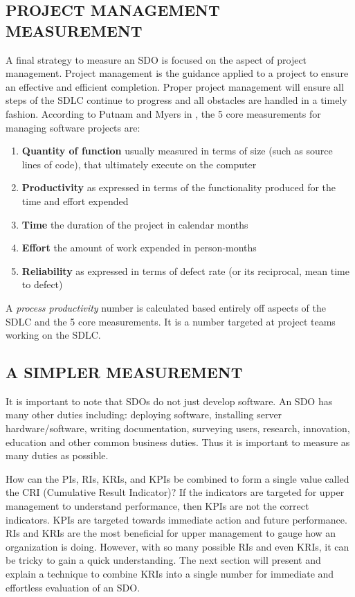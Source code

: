 \documentclass[SDSUThesis.tex]{subfiles}
\begin{document}
    \subsection{PROJECT MANAGEMENT MEASUREMENT}
    \label{sec:pm}
        A final strategy to measure an SDO is focused on the aspect of
        project management. Project management is the guidance
        applied to a project to ensure an effective and efficient
        completion.  Proper project management will ensure all steps
        of the SDLC
        continue to progress and all obstacles are handled
        in a timely fashion.  
        According to Putnam and Myers in \cite{Putnam2013}, 
        the 5 core measurements for managing software
        projects are:
        
        \begin{enumerate}
            \item \textbf{Quantity of function} usually measured in terms of size (such as source lines of code), that ultimately execute on the computer
            \item \textbf{Productivity} as expressed in terms of the functionality produced for the time and effort expended
            \item \textbf{Time} the duration of the project in calendar months
            \item \textbf{Effort} the amount of work expended in person-months
            \item \textbf{Reliability} as expressed in terms of defect rate (or its reciprocal, mean time to defect)
        \end{enumerate}
        
        A \textit{process productivity} number is calculated based entirely
        off aspects of the SDLC and the 5 core measurements.  It is a number
        targeted at project teams working on the SDLC.  
       
    \subsection{A SIMPLER MEASUREMENT}
    
        It is important to note that SDOs do not just
        develop software.  An SDO has many other duties
        including: deploying software, installing server hardware/software,
        writing documentation, surveying users, research, innovation,
        education and other common business duties.  Thus it is
        important to measure as many duties as possible.  
    
        How can the PIs, RIs, KRIs, and KPIs be combined to form a single
        value called the CRI (Cumulative Result Indicator)?  If the indicators
        are targeted for upper management to understand performance, then 
        KPIs are not the correct indicators.  KPIs are targeted towards
        immediate action and future performance.  RIs and KRIs are the most
        beneficial for upper management to gauge how an organization is doing.
        However, with so many possible RIs and even KRIs, it can be tricky
        to gain a quick understanding.  The next section will present
        and explain a technique to combine KRIs into a single number
        for immediate and  effortless evaluation of an SDO.
        
\end{document}
